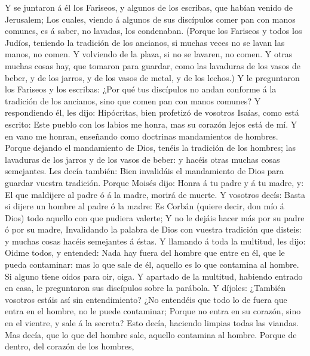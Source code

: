  Y se juntaron á él los Fariseos, y algunos de los
escribas, que habían venido de Jerusalem;  Los cuales,
viendo á algunos de sus discípulos comer pan con manos comunes, es á
saber, no lavadas, los condenaban.  (Porque los Fariseos y
todos los Judíos, teniendo la tradición de los ancianos, si muchas veces
no se lavan las manos, no comen.  Y volviendo de la plaza,
si no se lavaren, no comen. Y otras muchas cosas hay, que tomaron para
guardar, como las lavaduras de los vasos de beber, y de los jarros, y de
los vasos de metal, y de los lechos.)  Y le preguntaron
los Fariseos y los escribas: ¿Por qué tus discípulos no andan conforme á
la tradición de los ancianos, sino que comen pan con manos comunes?
 Y respondiendo él, les dijo: Hipócritas, bien profetizó
de vosotros Isaías, como está escrito: Este pueblo con los labios me
honra, mas su corazón lejos está de mí.  Y en vano me
honran, enseñando como doctrinas mandamientos de hombres. 
Porque dejando el mandamiento de Dios, tenéis la tradición de los
hombres; las lavaduras de los jarros y de los vasos de beber: y hacéis
otras muchas cosas semejantes.  Les decía también: Bien
invalidáis el mandamiento de Dios para guardar vuestra tradición.
 Porque Moisés dijo: Honra á tu padre y á tu madre, y: El
que maldijere al padre ó á la madre, morirá de muerte.  Y
vosotros decís: Basta si dijere un hombre al padre ó la madre: Es Corbán
(quiere decir, don mío á Dios) todo aquello con que pudiera valerte;
 Y no le dejáis hacer más por su padre ó por su madre,
 Invalidando la palabra de Dios con vuestra tradición que
disteis: y muchas cosas hacéis semejantes á éstas.  Y
llamando á toda la multitud, les dijo: Oidme todos, y entended:
 Nada hay fuera del hombre que entre en él, que le pueda
contaminar: mas lo que sale de él, aquello es lo que contamina al
hombre.  Si alguno tiene oídos para oir, oiga.
 Y apartado de la multitud, habiendo entrado en casa, le
preguntaron sus discípulos sobre la parábola.  Y díjoles:
¿También vosotros estáis así sin entendimiento? ¿No entendéis que todo
lo de fuera que entra en el hombre, no le puede contaminar;
 Porque no entra en su corazón, sino en el vientre, y
sale á la secreta? Esto decía, haciendo limpias todas las viandas.
 Mas decía, que lo que del hombre sale, aquello contamina
al hombre.  Porque de dentro, del corazón de los hombres,
